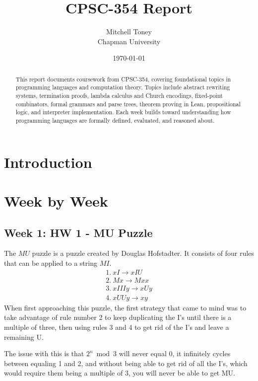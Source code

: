\documentclass{article}
\title{CPSC-354 Report}
\author{Mitchell Toney  \\ Chapman University}
\date{\today}
\theoremstyle{theorem}
\theoremstyle{definition}
\theoremstyle{remark}
\begin{document}
\maketitle

\begin{abstract}
This report documents coursework from CPSC-354, covering foundational topics in programming languages and computation theory. Topics include abstract rewriting systems, termination proofs, lambda calculus and Church encodings, fixed-point combinators, formal grammars and parse trees, theorem proving in Lean, propositional logic, and interpreter implementation. Each week builds toward understanding how programming languages are formally defined, evaluated, and reasoned about.
\end{abstract}

\setcounter{tocdepth}{3}
\tableofcontents

\section{Introduction}\label{intro}

\section{Week by Week}\label{homework}

\subsection{Week 1: HW 1 - MU Puzzle}
The $MU$ puzzle is a puzzle created by Douglas Hofstadter. It consists of four rules that can be applied to a string $MI$.
\[
\begin{array}{l}
1.\ xI \rightarrow xIU \\
2.\ Mx \rightarrow Mxx \\
3.\ xIIIy \rightarrow xUy \\
4.\ xUUy \rightarrow xy 
\end{array}
\]
When first approaching this puzzle, the first strategy that came to mind was to take advantage of rule number 2 to keep duplicating the I's until there is a multiple of three, then using rules 3 and 4 to get rid of the I's and leave a remaining U.

The issue with this is that $2^{n}\bmod 3$ will never equal 0, it infinitely cycles between equaling 1 and 2, and without being able to get rid of all the I's, which would require them being a multiple of 3, you will never be able to get MU.
\end{document}
